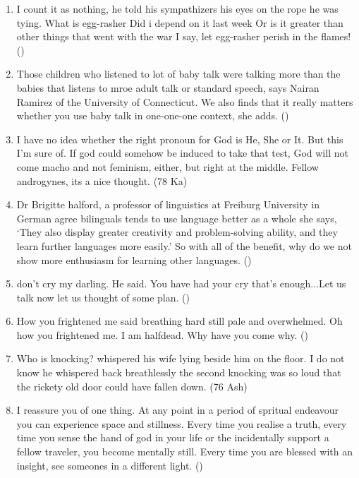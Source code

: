 \documentclass[12pt]{article}
\begin{document}
\begin{enumerate}
      \item I count it as nothing, he told his sympathizers his eyes on the rope he was tying. What is egg-rasher Did i depend on it last week Or is it greater than other things that went with the war I say, let egg-rasher perish in the flames! \hfill ()
        
      \item Those children who listened to lot of baby talk were talking more than the babies that listens to mroe adult talk or standard speech, says Nairan Ramirez of the University of Connecticut. We also finds that it really matters whether you use baby talk in one-one-one context, she adds. \hfill ()

      \item I have no idea whether the right pronoun for God is He, She or It. But this I'm sure of. If god could somehow be induced to take that test, God will not come macho and not feminism, either, but right at the middle. Fellow androgynes, its a nice thought. \hfill (78 Ka)
        
      \item Dr Brigitte halford, a professor of linguistics at Freiburg University in German agree bilinguals tends to use language better as a whole she says, `They also display greater creativity and problem-solving ability, and they learn further languages more easily.'
        So with all of the benefit, why do we not show more enthusiasm for learning other languages. \hfill ()

      \item don't cry my darling. He said. You have had your cry that's enough...Let us talk now let us thought of some plan. \hfill ()

      \item How you frightened me said breathing hard still pale and overwhelmed. Oh how you frightened me. I am halfdead. Why have you come why. \hfill ()

      \item Who is knocking? whispered his wife lying beside him on the floor. I do not know he whispered back breathlessly the second knocking was so loud that the rickety old door could have fallen down. \hfill (76 Ash)

      \item I reassure you of one thing. At any point in a period of spritual endeavour you can experience space and stillness. Every time you realise a truth, every time you sense the hand of god in your life or the incidentally support a fellow traveler, you become mentally still. Every time you are blessed with an insight, see someones in a different light. \hfill ()


\end{enumerate}
\end{document}
